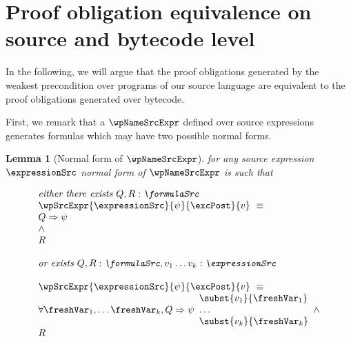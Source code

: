 

\newtheorem{wpExprSrc}{Lemma}[section]
\newtheorem{exprValueOnStack1}[wpExprSrc]{Lemma}
\newtheorem{exprSrcBcWp1}[wpExprSrc]{Lemma}
\newtheorem{exprSrcBcWp2}[wpExprSrc]{Lemma}
\newtheorem{wpStmtBcSrc1}[wpExprSrc]{Lemma}
\newtheorem{wpStmtBcSrc3}[wpExprSrc]{Lemma} %
\newtheorem{wpStmtBcSrc2}[wpExprSrc]{Lemma}
\newtheorem{theorem}{Theorem}[section]


\section{Proof obligation equivalence on source and bytecode level}\label{pogEq:aux}

In the following, we will argue that the proof obligations generated by the weakest precondition
over programs of our source language are equivalent to the  proof obligations generated over bytecode.

First, we remark that a $\wpNameSrcExpr$ defined over source  expressions generates formulas which may
 have two possible normal forms.


\begin{wpExprSrc}[Normal form of $\wpNameSrcExpr$] \label{pogEq:aux:wpExprSrc}
for any source expression $\expressionSrc$ 
normal form of  $\wpNameSrcExpr$ is such that 

$$ \begin{array}{l}
         \mbox{\rm\textit{either  there exists $ Q,R:\formulaSrc $  }} \\
         \wpSrcExpr{\expressionSrc }{ \psi }{ \excPost}{v} \  \equiv \\ 
          Q \Rightarrow \psi \\
          \wedge \\ 
	  R \\\\
	  \mbox{\rm\textit{or exists $ Q,R:\formulaSrc, v_1 \ldots v_k :\expressionSrc $   }} \\
\\
 \wpSrcExpr{\expressionSrc }{ \psi }{ \excPost}{v} \  \equiv \\
      \forall \freshVar_1, \ldots  \freshVar_k   ,  Q \Rightarrow \psi 
                                                                             \begin{array}{l}
									        \subst{v_1 }{ \freshVar_1 }  \\
										\ldots \\
										\subst{v_k}{ \freshVar_k } 
									     \end{array}
          \wedge \\ 
	  R  
   \end{array}  $$ \\
\end{wpExprSrc}

